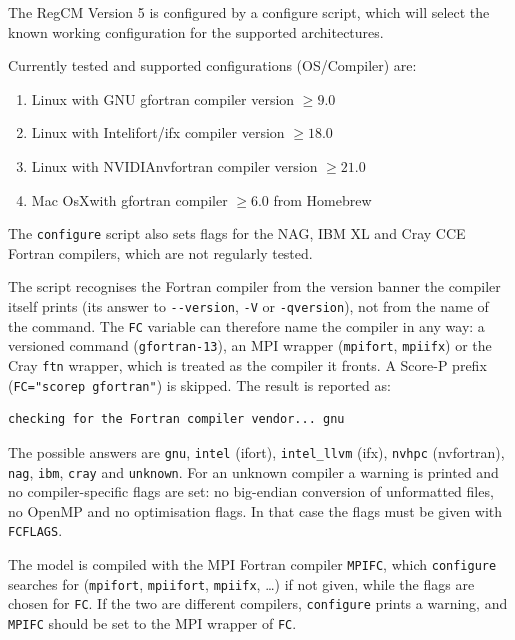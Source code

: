The RegCM Version 5 is configured by a configure script, which will select
the known working configuration for the supported architectures.

Currently tested and supported configurations (OS/Compiler) are:

\begin{enumerate}
\item Linux with GNU gfortran compiler version $\ge 9.0$
\item Linux with Intel\texttrademark ifort/ifx compiler version $\ge 18.0$
\item Linux with NVIDIA\texttrademark nvfortran compiler version $\ge 21.0$
\item Mac OsX\texttrademark with gfortran compiler $\ge 6.0$ from Homebrew
\end{enumerate}

The \verb=configure= script also sets flags for the NAG, IBM XL and Cray CCE
Fortran compilers, which are not regularly tested.

The script recognises the Fortran compiler from the version banner the
compiler itself prints (its answer to \verb=--version=, \verb=-V= or
\verb=-qversion=), not from the name of the command. The \verb=FC= variable
can therefore name the compiler in any way: a versioned command
(\verb=gfortran-13=), an MPI wrapper (\verb=mpifort=, \verb=mpiifx=) or the
Cray \verb=ftn= wrapper, which is treated as the compiler it fronts. A
Score-P prefix (\verb|FC="scorep gfortran"|) is skipped. The result is
reported as:

\begin{Verbatim}
checking for the Fortran compiler vendor... gnu
\end{Verbatim}

The possible answers are \verb=gnu=, \verb=intel= (ifort), \verb=intel_llvm=
(ifx), \verb=nvhpc= (nvfortran), \verb=nag=, \verb=ibm=, \verb=cray= and
\verb=unknown=. For an unknown compiler a warning is printed and no
compiler-specific flags are set: no big-endian conversion of unformatted
files, no OpenMP and no optimisation flags. In that case the flags must be
given with \verb=FCFLAGS=.

The model is compiled with the MPI Fortran compiler \verb=MPIFC=, which
\verb=configure= searches for (\verb=mpifort=, \verb=mpiifort=,
\verb=mpiifx=, \ldots) if not given, while the flags are chosen for
\verb=FC=. If the two are different compilers, \verb=configure= prints a
warning, and \verb=MPIFC= should be set to the MPI wrapper of \verb=FC=.

